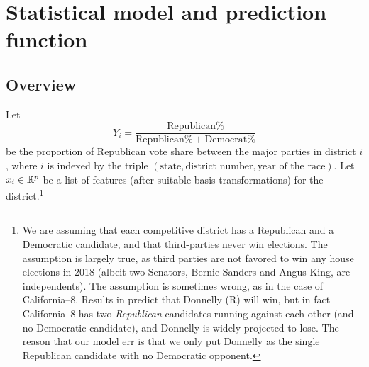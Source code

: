 \documentclass[12pt, letterpaper]{article}
\begin{document}
\section{Statistical model and prediction function}
\label{sec:model}
\subsection{Overview}
Let \[Y_i = \frac{\text{Republican}\% }{\text{Republican}\% + \text{Democrat}\%}\] be the proportion of Republican vote share between the major parties in district $i$, where $i$ is indexed by the triple $(\text{state}, \text{district number}, \text{year of the race})$.
Let $x_i\in \mathbb{R}^p$ be a list of features (after suitable basis transformations)
for the district.\footnote{We are assuming that each competitive district has a
Republican and a Democratic candidate, and that third-parties never win
elections. The assumption is largely true, as third parties are not favored to
win any house elections in 2018 (albeit two Senators, Bernie Sanders and Angus
King, are independents). The assumption is sometimes wrong, as in the case of
California--8. Results in  predict that Donnelly (R)
will win, but in fact California--8 has two \emph{Republican} candidates running
against each other (and no Democratic candidate), and Donnelly is widely
projected to lose. The reason that our model err is that we only put Donnelly as the single Republican candidate with no Democratic opponent.}
\end{document}
